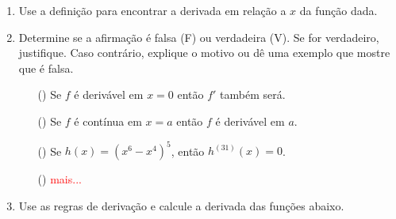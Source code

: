 \begin{enumerate}
    \item Use a definição para encontrar a derivada em relação a $x$ da função dada.
        \begin{enumerate}
        \end{enumerate}

    \item Determine se a afirmação é falsa (F) ou verdadeira (V). Se for verdadeiro, justifique. Caso contrário, explique o motivo ou dê uma exemplo que mostre que é falsa.
    \begin{enumerate}
        \item[(\quad )] Se $f$ é derivável em $x=0$ então $f'$ também será.
        \item[(\quad)] Se $f$ é contínua em $x=a$ então $f$ é derivável em $a$.
        \item[(\quad )] Se $h(x)=\left(x^6-x^4\right)^5$, então $h^{(31)}(x)=0$.
        \item[(\quad)] \textcolor{red}{mais...}
    \end{enumerate}
    
    

    \item Use as regras de derivação e calcule a derivada das funções abaixo.
        \begin{enumerate}
        \end{enumerate}
        

\end{enumerate}
